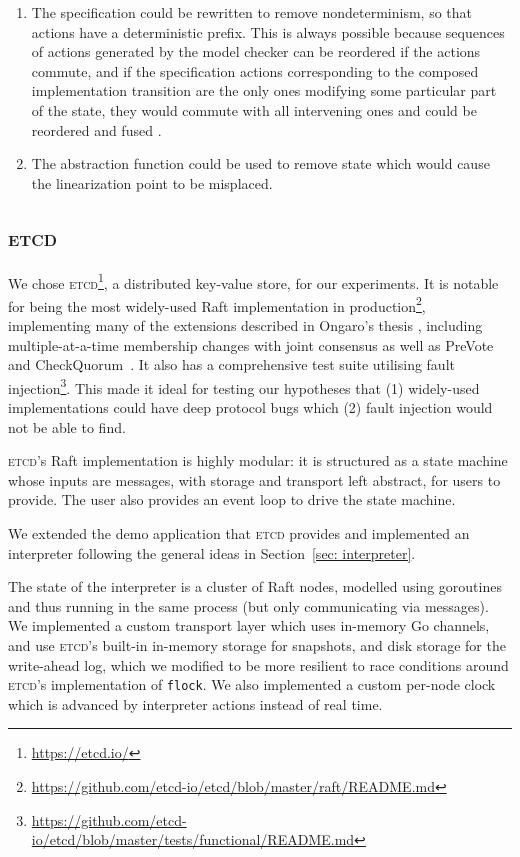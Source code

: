 \documentclass[a4paper]{article}
\newcommand{\tname}[1]{\textsc{#1}\xspace}
\newcommand{\etcd}{\tname{etcd}}
\begin{document}
\begin{itemize}
\begin{enumerate}
\item The specification could be rewritten to remove nondeterminism, so that actions have a deterministic prefix.
%
This is always possible because sequences of actions generated by the model checker can be reordered if the actions commute, and if the specification actions corresponding to the composed implementation transition are the only ones modifying some particular part of the state, they would commute with all intervening ones and could be reordered and fused \cite{lipton1975reduction}.

\item The abstraction function could be used to remove state which would cause the linearization point to be misplaced.
\end{enumerate}

\end{itemize}

\subsection{\etcd}

We chose \etcd\footnote{\url{https://etcd.io/}}, a distributed key-value store, for our experiments.
%
It is notable for being the most widely-used Raft implementation in production\footnote{\url{https://github.com/etcd-io/etcd/blob/master/raft/README.md}}, implementing many of the extensions described in Ongaro's thesis \cite{ongaro_consensus_2014}, including multiple-at-a-time membership changes with joint consensus as well as PreVote and CheckQuorum~\cite{howard_raft_2020}.
%
It also has a comprehensive test suite utilising fault injection\footnote{\url{https://github.com/etcd-io/etcd/blob/master/tests/functional/README.md}}.
%
This made it ideal for testing our hypotheses that (1) widely-used implementations could have deep protocol bugs which (2) fault injection would not be able to find.

\etcd's Raft implementation is highly modular: it is structured as a state machine whose inputs are messages, with storage and transport left abstract, for users to provide.
%
The user also provides an event loop to drive the state machine.

We extended the demo application that \etcd provides and implemented an interpreter following the general ideas in Section~\ref{sec: interpreter}.

The state of the interpreter is a cluster of Raft nodes, modelled using goroutines and thus running in the same process (but only communicating via messages).
%
We implemented a custom transport layer which uses in-memory Go channels, and use \etcd's built-in in-memory storage for snapshots, and disk storage for the write-ahead log, which we modified to be more resilient to race conditions around \etcd's implementation of \texttt{flock}.
%
We also implemented a custom per-node clock which is advanced by interpreter actions instead of real time.
\end{document}
